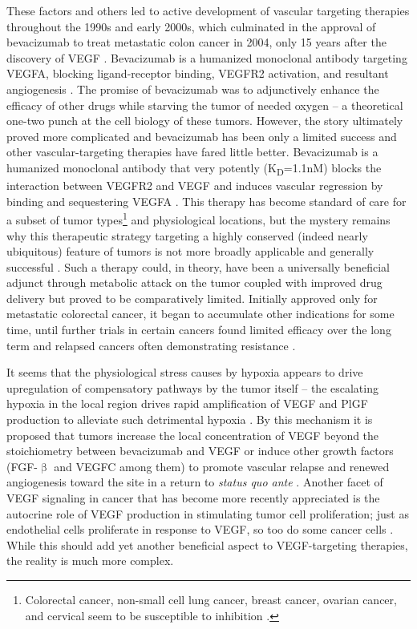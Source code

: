 These factors and others led to active development of vascular targeting therapies throughout the 1990s and early 2000s, which culminated in the approval of bevacizumab to treat metastatic colon cancer in 2004, only 15 years after the discovery of VEGF \citep{Ferrara2004, Leung1989, Gordon2005b, McCormack2008, Kabbinavar2005, Muhsin2004}. Bevacizumab is a humanized monoclonal antibody targeting VEGFA, blocking ligand\hyp{}receptor binding, VEGFR2 activation, and resultant angiogenesis \citep{Keating2014}. The promise of bevacizumab was to adjunctively enhance the efficacy of other drugs while starving the tumor of needed oxygen -- a theoretical one\hyp{}two punch at the cell biology of these tumors. However, the story ultimately proved more complicated and bevacizumab has been only a limited success and other vascular\hyp{}targeting therapies have fared little better. Bevacizumab is a humanized monoclonal antibody that very potently (K\textsubscript{D}=1.1nM) blocks the interaction between VEGFR2 and VEGF and induces vascular regression by binding and sequestering VEGFA \citep{Papadopoulos2012, Yang2014a}. This therapy has become standard of care for a subset of tumor types\footnote{Colorectal cancer, non\hyp{}small cell lung cancer, breast cancer, ovarian cancer, and cervical seem to be susceptible to inhibition \citep{KazaziHyseni2010, Garcia2013, Baraniskin2019, Botrel2016, Gridelli2018, Tewari2014}.} and physiological locations, but the mystery remains why this therapeutic strategy targeting a highly conserved (indeed nearly ubiquitous) feature of tumors is not more broadly applicable and generally successful \citep{VanMeter2010}. Such a therapy could, in theory, have been a universally beneficial adjunct through metabolic attack on the tumor coupled with improved drug delivery but proved to be comparatively limited. Initially approved only for metastatic colorectal cancer, it began to accumulate other indications for some time, until further trials in certain cancers found limited efficacy over the long term and relapsed cancers often demonstrating resistance \citep{Itatani2018, Rivera2015}. 

It seems that the physiological stress causes by hypoxia appears to drive upregulation of compensatory pathways by the tumor itself -- the escalating hypoxia in the local region drives rapid amplification of VEGF and PlGF production to alleviate such detrimental hypoxia \citep{Alidzanovic2016, Gardner2017}. By this mechanism it is proposed that tumors increase the local concentration of VEGF beyond the stoichiometry between bevacizumab and VEGF or induce other growth factors (FGF\hyp{}$\upbeta$ and VEGFC among them) to promote vascular relapse and renewed angiogenesis toward the site in a return to \textit{status quo ante} \citep{Haibe2020, Montemagno2020, Zhao2017, Zahra2021, Michaelsen2018}. Another facet of VEGF signaling in cancer that has become more recently appreciated is the autocrine role of VEGF production in stimulating tumor cell proliferation; just as endothelial cells proliferate in response to VEGF, so too do some cancer cells \citep{Goel2013}. While this should add yet another beneficial aspect to VEGF\hyp{}targeting therapies, the reality is much more complex.

